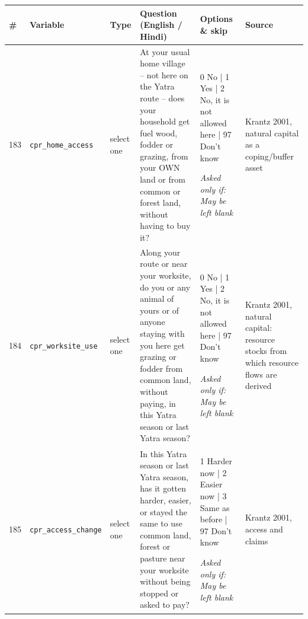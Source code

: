 \documentclass[9pt,a4paper,landscape]{article}
\begin{document}
\begin{longtable}{@{}p{0.5cm}p{3.3cm}p{1.7cm}p{7.3cm}p{5.6cm}p{5.4cm}@{}}
\toprule \footnotesize\textbf{\#} & \footnotesize\textbf{Variable} & \footnotesize\textbf{Type} & \footnotesize\textbf{Question (English / Hindi)} & \footnotesize\textbf{Options {\&} skip} & \footnotesize\textbf{Source}\\ \midrule
\endhead
\footnotesize 183 & \footnotesize\texttt{cpr\_home\_access} & \scriptsize select one & \footnotesize At your usual home village -- not here on the Yatra route -- does your household get fuel wood, fodder or grazing, from your OWN land or from common or forest land, without having to buy it?\par\vspace{1pt}{\footnotesize\color{hdr}{\hifont आपके असली घर पर — यहाँ यात्रा के रास्ते पर नहीं — क्या आपके घर को लकड़ी, चारा या जानवर चराने की जगह, अपनी ज़मीन से या साझा या जंगल की ज़मीन से, बिना पैसे दिए मिल जाती है?}} & \scriptsize 0 No | 1 Yes | 2 No, it is not allowed here | 97 Don't know\par\vspace{1pt}\textit{Asked only if: May be left blank} & \scriptsize Krantz 2001, natural capital as a coping/buffer asset\\
\footnotesize 184 & \footnotesize\texttt{cpr\_worksite\_use} & \scriptsize select one & \footnotesize Along your route or near your worksite, do you or any animal of yours or of anyone staying with you here get grazing or fodder from common land, without paying, in this Yatra season or last Yatra season?\par\vspace{1pt}{\footnotesize\color{hdr}{\hifont इस यात्रा सीज़न या पिछले यात्रा सीज़न में, क्या आपको या आपके किसी जानवर को, या आपके साथ यहाँ रहने वाले किसी को, रास्ते पर या काम की जगह के पास साझा ज़मीन से बिना पैसे दिए चारा या चरागाह मिली?}} & \scriptsize 0 No | 1 Yes | 2 No, it is not allowed here | 97 Don't know\par\vspace{1pt}\textit{Asked only if: May be left blank} & \scriptsize Krantz 2001, natural capital: resource stocks from which resource flows are derived\\
\footnotesize 185 & \footnotesize\texttt{cpr\_access\_change} & \scriptsize select one & \footnotesize In this Yatra season or last Yatra season, has it gotten harder, easier, or stayed the same to use common land, forest or pasture near your worksite without being stopped or asked to pay?\par\vspace{1pt}{\footnotesize\color{hdr}{\hifont इस यात्रा सीज़न या पिछले यात्रा सीज़न में, अपने काम की जगह के पास साझा ज़मीन, जंगल या चरागाह का बिना रोक-टोक या पैसे दिए इस्तेमाल करना — पहले से मुश्किल हुआ है, आसान हुआ है, या वैसा ही है?}} & \scriptsize 1 Harder now | 2 Easier now | 3 Same as before | 97 Don't know\par\vspace{1pt}\textit{Asked only if: May be left blank} & \scriptsize Krantz 2001, access and claims\\
\bottomrule\end{longtable}\vspace{6pt}
\end{document}
